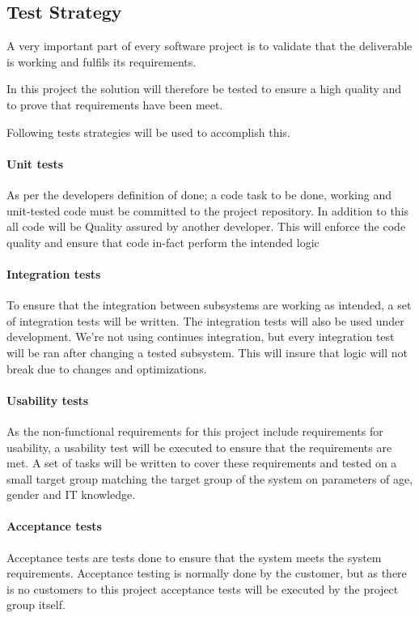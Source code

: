 \documentclass[../report.tex]{subfiles}
\begin{document}
\graphicspath{{img/}{../img/}}

\subsection{Test Strategy}

A very important part of every software project is to validate that the deliverable is working and fulfils its requirements.

In this project the solution will therefore be tested to ensure a high quality and to prove that requirements have been meet.

Following tests strategies will be used to accomplish this.

\paragraph{Unit tests}
As per the developers definition of done; a code task to be done, working and unit-tested code must be committed to the project repository. In addition to this all code will be Quality assured by another developer. This will enforce the code quality and ensure that code in-fact perform the intended logic

\paragraph{Integration tests}

To ensure that the integration between subsystems are working as intended, a set of integration tests will be written. The integration tests will also be used under development. We're not using continues integration, but every integration test will be ran after changing a tested subsystem. This will insure that logic will not break due to changes and optimizations.

\paragraph{Usability tests}
As the non-functional requirements for this project include requirements for usability, a usability test will be executed to ensure that the requirements are met. A set of tasks will be written to cover these requirements and tested on a small target group matching the target group of the system on parameters of age, gender and IT knowledge.

\paragraph{Acceptance tests}
Acceptance tests are tests done to ensure that the system meets the system requirements. Acceptance testing is normally done by the customer, but as there is no customers to this project acceptance tests will be executed by the project group itself.
\end{document}
